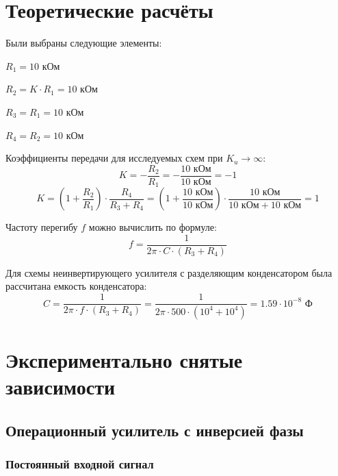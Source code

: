 \section{Теоретические расчёты}

Были выбраны следующие элементы:
\begin{center}
	$R_1 = 10$ кОм
	
	$R_2 = K\cdot R_1 = 10$ кОм

	$R_3 = R_1 = 10$ кОм

	$R_4 = R_2 = 10$ кОм
\end{center}

Коэффициенты передачи для исследуемых схем при $K_u \rightarrow \infty$:
\begin{equation}\label{eq:k1}
	K = -\frac{R_2}{R_1} = -\frac{10\text{ кОм}}{10\text{ кОм}} = -1 
\end{equation}
\vspace{-0.75cm}
\begin{equation}\label{eq:k2}
	K = \left(1+\frac{R_2}{R_1}\right) \cdot \frac{R_4}{R_3 + R_4} = \left(1+\frac{10\text{ кОм}}{10\text{ кОм}}\right) \cdot \frac{10\text{ кОм}}{10\text{ кОм} + 10\text{ кОм}} = 1
\end{equation}

Частоту перегибу $f$ можно вычислить по формуле: 
\begin{equation}
f = \frac{1}{2 \pi \cdot C \cdot (R_3 + R_4)}
\end{equation}

Для схемы неинвертирующего усилителя с разделяющим конденсатором была рассчитана емкость конденсатора: \\
\begin{equation}
	C = \frac{1}{2\pi \cdot f\cdot (R_3 + R_4)} = \frac{1}{2\pi \cdot 500\cdot  (10^4 + 10^4)} = 1.59\cdot 10^{-8}\text{ Ф}
\end{equation}

\section{Экспериментально снятые зависимости}

\subsection{Операционный усилитель с инверсией фазы}

\subsubsection{Постоянный входной сигнал}

